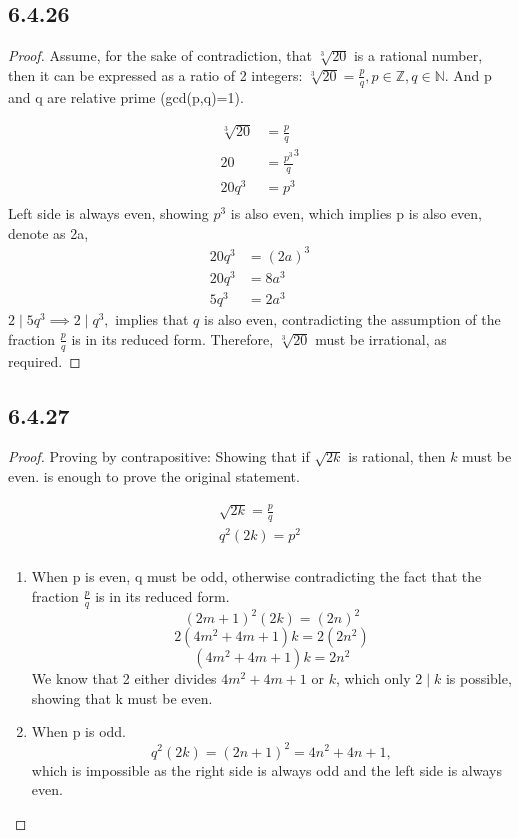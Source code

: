 \documentclass{article}
\begin{document}
\subsection*{6.4.26}

\begin{proof}
    Assume, for the sake of contradiction, that $\sqrt[3]{20}$ is a rational number, then it can be expressed as a ratio of 2 integers: $\sqrt[3]{20}=\frac{p}q,p\in\mathbb{Z},q\in\mathbb{N}.$ And p and q are relative prime (gcd(p,q)=1).

    \begin{align*}
        \sqrt[3]{20}&=\frac{p}q\\
        20&=\frac{p^3}q^3\\
        20q^3&=p^3\\
    \end{align*}
    Left side is always even, showing $p^3$ is also even, which implies p is also even, denote as 2a,
    \begin{align*}
        20q^3&=(2a)^3\\
        20q^3&=8a^3\\
        5q^3&=2a^3
    \end{align*}
    $2\mid 5q^3\implies 2\mid q^3,$ implies that $q$ is also even, contradicting the assumption of the fraction $\frac{p}q$ is in its reduced form. Therefore, $\sqrt[3]{20}$ must be irrational, as required.
\end{proof}

\subsection*{6.4.27}


\begin{proof}
    Proving by contrapositive: Showing that if $\sqrt{2k}$ is rational, then $k$ must be even. is enough to prove the original statement.

    \begin{gather*}
        \sqrt{2k}=\frac{p}q\\
        q^2(2k)=p^2\\
    \end{gather*}
\begin{enumerate}
    \item When p is even, q must be odd, otherwise contradicting the fact that the fraction $\frac{p}q$ is in its reduced form. $$(2m+1)^2(2k)=(2n)^2$$ $$2(4m^2+4m+1)k=2(2n^2)$$ $$(4m^2+4m+1)k=2n^2$$ We know that 2 either divides $4m^2+4m+1$ or $k$, which only $2\mid k$ is possible, showing that k must be even.
    \item When p is odd. $$q^2(2k)=(2n+1)^2=4n^2+4n+1,$$ which is impossible as the right side is always odd and the left side is always even. 
\end{enumerate}
\end{proof}
\end{document}
